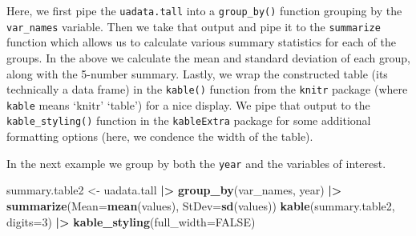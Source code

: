 \documentclass[
]{book}
\newenvironment{Shaded}{\begin{snugshade}}{\end{snugshade}}
\newcommand{\AttributeTok}[1]{\textcolor[rgb]{0.13,0.29,0.53}{#1}}
\newcommand{\ConstantTok}[1]{\textcolor[rgb]{0.56,0.35,0.01}{#1}}
\newcommand{\DecValTok}[1]{\textcolor[rgb]{0.00,0.00,0.81}{#1}}
\newcommand{\FunctionTok}[1]{\textcolor[rgb]{0.13,0.29,0.53}{\textbf{#1}}}
\newcommand{\NormalTok}[1]{#1}
\newcommand{\OtherTok}[1]{\textcolor[rgb]{0.56,0.35,0.01}{#1}}
\newcommand{\SpecialCharTok}[1]{\textcolor[rgb]{0.81,0.36,0.00}{\textbf{#1}}}
\begin{document}
Here, we first pipe the \texttt{uadata.tall} into a \texttt{group\_by()} function grouping by the \texttt{var\_names} variable.
Then we take that output and pipe it to the \texttt{summarize} function which allows us to calculate various summary statistics for each of the groups.
In the above we calculate the mean and standard deviation of each group, along with the 5-number summary.
Lastly, we wrap the constructed table (its technically a data frame) in the \texttt{kable()} function from the \texttt{knitr} package \citep{R-knitr} (where \texttt{kable} means `knitr' `table') for a nice display.
We pipe that output to the \texttt{kable\_styling()} function in the \texttt{kableExtra} package \citep{R-kableExtra} for some additional formatting options (here, we condence the width of the table).

In the next example we group by both the \texttt{year} and the variables of interest.

\begin{Shaded}
\begin{Highlighting}[]
\NormalTok{summary.table2 }\OtherTok{\textless{}{-}}\NormalTok{ uadata.tall }\SpecialCharTok{|\textgreater{}}
  \FunctionTok{group\_by}\NormalTok{(var\_names, year) }\SpecialCharTok{|\textgreater{}}
  \FunctionTok{summarize}\NormalTok{(}\AttributeTok{Mean=}\FunctionTok{mean}\NormalTok{(values),}
            \AttributeTok{StDev=}\FunctionTok{sd}\NormalTok{(values))}
\FunctionTok{kable}\NormalTok{(summary.table2, }\AttributeTok{digits=}\DecValTok{3}\NormalTok{) }\SpecialCharTok{|\textgreater{}}
  \FunctionTok{kable\_styling}\NormalTok{(}\AttributeTok{full\_width=}\ConstantTok{FALSE}\NormalTok{)}
\end{Highlighting}
\end{Shaded}
\end{document}
